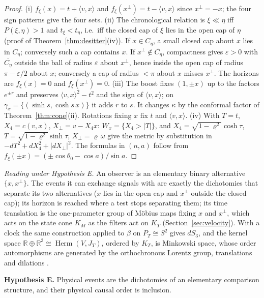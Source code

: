\documentclass[aps,pra,onecolumn,superscriptaddress,nofootinbib,10pt]{revtex4-2}
\theoremstyle{definition}
\theoremstyle{remark}
\newcommand{\R}{\mathbb{R}}
\newcommand{\Herm}{\operatorname{Herm}}
\newcommand{\ip}[2]{\langle #1,#2\rangle}
\begin{document}
\begin{proof}
(i) $f_\xi(x)=t+\ip vx$ and $f_\xi(x^\perp)=t-\ip vx$ since $x^\perp=-x$; the four sign patterns give the
four sets.  (ii) The chronological relation is $\xi\ll\eta$ iff $P(\xi,\eta)>1$ and $t_\xi<t_\eta$, i.e.\ iff the
closed cap of $\xi$ lies in the open cap of $\eta$ (proof of Theorem~\ref{thm:desitter}(iv)).  If $x\in C_\eta$, a
small closed cap about $x$ lies in $C_\eta$; conversely such a cap contains $x$.  If
$x^\perp\notin\overline{C_\eta}$, compactness gives $\varepsilon>0$ with $\overline{C_\eta}$ outside the ball of
radius $\varepsilon$ about $x^\perp$, hence inside the open cap of radius $\pi-\varepsilon/2$ about $x$;
conversely a cap of radius $<\pi$ about $x$ misses $x^\perp$.  The horizons are $f_\xi(x)=0$ and
$f_\xi(x^\perp)=0$.  (iii) The boost fixes $(1,\pm x)$ up to the factors $e^{\pm r}$ and preserves
$\ip vx^2-t^2$ and the sign of $\ip vx$; on $\gamma_x=\{(\sinh s,\cosh s\,x)\}$ it adds $r$ to $s$.  It
changes $\kappa$ by the conformal factor of Theorem~\ref{thm:cone}(ii).  Rotations fixing $x$ fix $t$ and
$\ip vx$.  (iv) With $T=t$, $X_4=c(v,x)$, $X_\perp=v-X_4x$: $W_x=\{X_4>\lvert T\rvert\}$, and
$X_4=\sqrt{1-\varrho^2}\cosh\tau$, $T=\sqrt{1-\varrho^2}\sinh\tau$, $X_\perp=\varrho\,\omega$ give the metric by
substitution in $-dT^2+dX_4^2+\lvert dX_\perp\rvert^2$.  The formulas in $(n,a)$ follow from
$f_\xi(\pm x)=(\pm\cos\theta_0-\cos a)/\sin a$.
\end{proof}

\noindent\emph{Reading under Hypothesis E.}  An observer is an elementary binary alternative
$\{x,x^\perp\}$.  The events it can exchange signals with are exactly the dichotomies that separate its two
alternatives ($x$ lies in the open cap and $x^\perp$ outside the closed cap); its horizon is reached where a test stops separating them;
its time translation is the one-parameter group of M\"obius maps fixing $x$ and $x^\perp$, which acts on
the state cone $K_M$ as the filters act on $K_T$ (Section~\ref{sec:velocity}).  With a clock the same
construction applied to $\beta$ on $P_T\cong S^2$ gives $dS_3$, and the kernel space
$\R\oplus\R^3\cong\Herm(V,J_T)$, ordered by $K_T$, is Minkowski space, whose order automorphisms are
generated by the orthochronous Lorentz group, translations and dilations \cite{AO53,Zeeman}.

\smallskip\noindent\textbf{Hypothesis E.}\label{hyp:E}  Physical events are the dichotomies of an elementary
comparison structure, and their physical causal order is inclusion.
\end{document}
